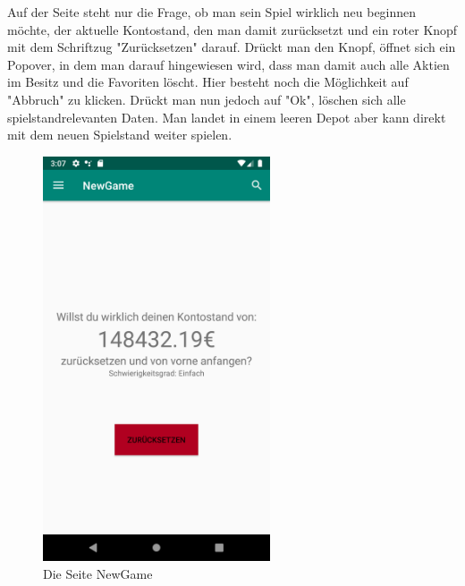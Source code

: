 \documentclass[10pt]{scrartcl}
\begin{document}
Auf der Seite steht nur die Frage, ob man sein Spiel wirklich neu beginnen möchte, der aktuelle Kontostand, den man damit zurücksetzt und ein roter Knopf mit dem Schriftzug "Zurücksetzen" darauf. Drückt man den Knopf, öffnet sich ein Popover, in dem man darauf hingewiesen wird, dass man damit auch alle Aktien im Besitz und die Favoriten löscht. Hier besteht noch die Möglichkeit auf "Abbruch" zu klicken. Drückt man nun jedoch auf "Ok", löschen sich alle spielstandrelevanten Daten. Man landet in einem leeren Depot aber kann direkt mit dem neuen Spielstand weiter spielen.

\begin{figure}[H]
	\centering
	\includegraphics[width=0.6\textwidth]{Bilder/Applikation/NewGame.png}
	\caption{Die Seite NewGame}
\end{figure}
\end{document}
